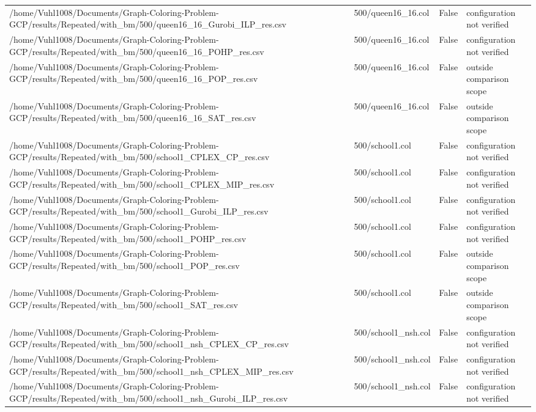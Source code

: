 \begin{table}[htbp]
\begin{tabular}{llll}
/home/Vuhl1008/Documents/Graph-Coloring-Problem-GCP/results/Repeated/with\_bm/500/queen16\_16\_Gurobi\_ILP\_res.csv & 500/queen16\_16.col & False & configuration not verified \\
/home/Vuhl1008/Documents/Graph-Coloring-Problem-GCP/results/Repeated/with\_bm/500/queen16\_16\_POHP\_res.csv & 500/queen16\_16.col & False & configuration not verified \\
/home/Vuhl1008/Documents/Graph-Coloring-Problem-GCP/results/Repeated/with\_bm/500/queen16\_16\_POP\_res.csv & 500/queen16\_16.col & False & outside comparison scope \\
/home/Vuhl1008/Documents/Graph-Coloring-Problem-GCP/results/Repeated/with\_bm/500/queen16\_16\_SAT\_res.csv & 500/queen16\_16.col & False & outside comparison scope \\
/home/Vuhl1008/Documents/Graph-Coloring-Problem-GCP/results/Repeated/with\_bm/500/school1\_CPLEX\_CP\_res.csv & 500/school1.col & False & configuration not verified \\
/home/Vuhl1008/Documents/Graph-Coloring-Problem-GCP/results/Repeated/with\_bm/500/school1\_CPLEX\_MIP\_res.csv & 500/school1.col & False & configuration not verified \\
/home/Vuhl1008/Documents/Graph-Coloring-Problem-GCP/results/Repeated/with\_bm/500/school1\_Gurobi\_ILP\_res.csv & 500/school1.col & False & configuration not verified \\
/home/Vuhl1008/Documents/Graph-Coloring-Problem-GCP/results/Repeated/with\_bm/500/school1\_POHP\_res.csv & 500/school1.col & False & configuration not verified \\
/home/Vuhl1008/Documents/Graph-Coloring-Problem-GCP/results/Repeated/with\_bm/500/school1\_POP\_res.csv & 500/school1.col & False & outside comparison scope \\
/home/Vuhl1008/Documents/Graph-Coloring-Problem-GCP/results/Repeated/with\_bm/500/school1\_SAT\_res.csv & 500/school1.col & False & outside comparison scope \\
/home/Vuhl1008/Documents/Graph-Coloring-Problem-GCP/results/Repeated/with\_bm/500/school1\_nsh\_CPLEX\_CP\_res.csv & 500/school1\_nsh.col & False & configuration not verified \\
/home/Vuhl1008/Documents/Graph-Coloring-Problem-GCP/results/Repeated/with\_bm/500/school1\_nsh\_CPLEX\_MIP\_res.csv & 500/school1\_nsh.col & False & configuration not verified \\
/home/Vuhl1008/Documents/Graph-Coloring-Problem-GCP/results/Repeated/with\_bm/500/school1\_nsh\_Gurobi\_ILP\_res.csv & 500/school1\_nsh.col & False & configuration not verified \\

\end{tabular}
\end{table}
